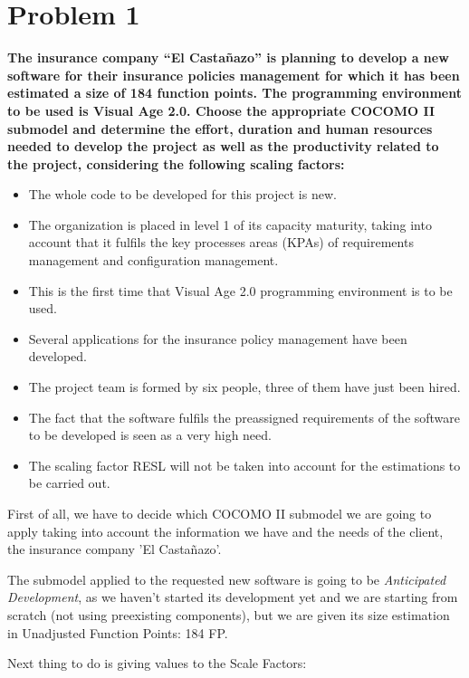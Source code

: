 \section{Problem 1}

\textbf{The insurance company “El Casta\~nazo” is planning to develop a new software for their insurance policies management for which it has been estimated a size of 184 function points.
The programming environment to be used is Visual Age 2.0. Choose the appropriate COCOMO II submodel and determine the effort, duration and human resources needed to develop the project as well as the productivity related to the project, considering the following scaling factors:}

\begin{itemize}
\item The whole code to be developed for this project is new.
\item The organization is placed in level 1 of its capacity maturity, taking into account that it fulfils the key processes areas (KPAs) of requirements
management and configuration management.
\item This is the first time that Visual Age 2.0 programming environment is to be used.
\item Several applications for the insurance policy management have been developed.
\item The project team is formed by six people, three of them have just been hired.
\item The fact that the software fulfils the preassigned requirements of the software to be developed is seen as a very high need.
\item The scaling factor RESL will not be taken into account for the estimations to be carried out.
\end{itemize}


\seprule

First of all, we have to decide which COCOMO II submodel we are going to apply taking into account the information we have and the needs of the client, the insurance company 'El Casta\~nazo'.

The submodel applied to the requested new software is going to be \emph{Anticipated Development}, as we haven't started its development yet and we are starting from scratch (not using preexisting components), but we are given its size estimation in Unadjusted Function Points: 184 FP.

Next thing to do is giving values to the Scale Factors:

